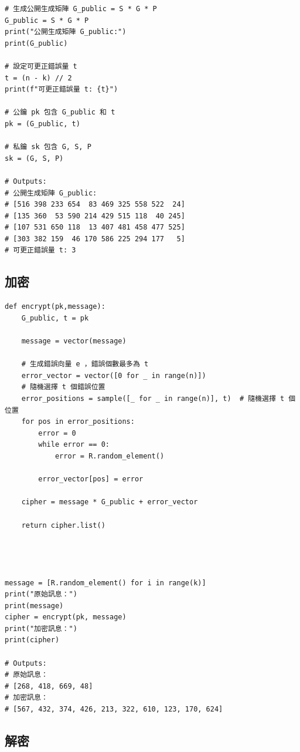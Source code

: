 \documentclass[
]{article}
\begin{document}
\begin{verbatim}
# 生成公開生成矩陣 G_public = S * G * P
G_public = S * G * P
print("公開生成矩陣 G_public:")
print(G_public)

# 設定可更正錯誤量 t
t = (n - k) // 2
print(f"可更正錯誤量 t: {t}")

# 公鑰 pk 包含 G_public 和 t
pk = (G_public, t)

# 私鑰 sk 包含 G, S, P
sk = (G, S, P)

# Outputs:
# 公開生成矩陣 G_public:
# [516 398 233 654  83 469 325 558 522  24]
# [135 360  53 590 214 429 515 118  40 245]
# [107 531 650 118  13 407 481 458 477 525]
# [303 382 159  46 170 586 225 294 177   5]
# 可更正錯誤量 t: 3
\end{verbatim}

\hypertarget{ux52a0ux5bc6-1}{%
\subsection{加密}\label{ux52a0ux5bc6-1}}

\begin{verbatim}
def encrypt(pk,message):
    G_public, t = pk

    message = vector(message)

    # 生成錯誤向量 e ，錯誤個數最多為 t 
    error_vector = vector([0 for _ in range(n)])
    # 隨機選擇 t 個錯誤位置
    error_positions = sample([_ for _ in range(n)], t)  # 隨機選擇 t 個位置
    for pos in error_positions:
        error = 0
        while error == 0:
            error = R.random_element()
            
        error_vector[pos] = error

    cipher = message * G_public + error_vector

    return cipher.list()
        
    


message = [R.random_element() for i in range(k)]
print("原始訊息：")
print(message)
cipher = encrypt(pk, message)
print("加密訊息：")
print(cipher)

# Outputs:
# 原始訊息：
# [268, 418, 669, 48]
# 加密訊息：
# [567, 432, 374, 426, 213, 322, 610, 123, 170, 624]
\end{verbatim}

\hypertarget{ux89e3ux5bc6}{%
\subsection{解密}\label{ux89e3ux5bc6}}
\end{document}
